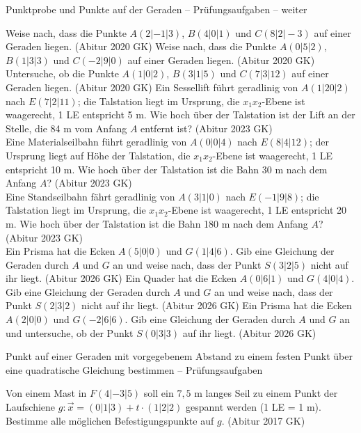 \begin{aufgabe}{Punktprobe und Punkte auf der Geraden – Prüfungsaufgaben – weiter}
\begin{teile}
\teil Weise nach, dass die Punkte $A(2 | -1 | 3)$, $B(4 | 0 | 1)$ und $C(8 | 2 | -3)$ auf einer Geraden liegen. \hfill (Abitur 2020 GK)
\teil Weise nach, dass die Punkte $A(0 | 5 | 2)$, $B(1 | 3 | 3)$ und $C(-2 | 9 | 0)$ auf einer Geraden liegen. \hfill (Abitur 2020 GK)
\teil Untersuche, ob die Punkte $A(1 | 0 | 2)$, $B(3 | 1 | 5)$ und $C(7 | 3 | 12)$ auf einer Geraden liegen. \hfill (Abitur 2020 GK)
\teil Ein Sessellift führt geradlinig von $A(1 | 20 | 2)$ nach $E(7 | 2 | 11)$; die Talstation liegt im Ursprung, die $x_1x_2$-Ebene ist waagerecht, 1 LE entspricht 5 m. Wie hoch über der Talstation ist der Lift an der Stelle, die 84 m vom Anfang $A$ entfernt ist? \hfill (Abitur 2023 GK) \\ \leerfeld[m]
\teil Eine Materialseilbahn führt geradlinig von $A(0 | 0 | 4)$ nach $E(8 | 4 | 12)$; der Ursprung liegt auf Höhe der Talstation, die $x_1x_2$-Ebene ist waagerecht, 1 LE entspricht 10 m. Wie hoch über der Talstation ist die Bahn 30 m nach dem Anfang $A$? \hfill (Abitur 2023 GK) \\ \leerfeld[m]
\teil Eine Standseilbahn fährt geradlinig von $A(3 | 1 | 0)$ nach $E(-1 | 9 | 8)$; die Talstation liegt im Ursprung, die $x_1x_2$-Ebene ist waagerecht, 1 LE entspricht 20 m. Wie hoch über der Talstation ist die Bahn 180 m nach dem Anfang $A$? \hfill (Abitur 2023 GK) \\ \leerfeld[m]
\teil Ein Prisma hat die Ecken $A(5 | 0 | 0)$ und $G(1 | 4 | 6)$. Gib eine Gleichung der Geraden durch $A$ und $G$ an und weise nach, dass der Punkt $S(3 | 2 | 5)$ nicht auf ihr liegt. \hfill (Abitur 2026 GK)
\teil Ein Quader hat die Ecken $A(0 | 6 | 1)$ und $G(4 | 0 | 4)$. Gib eine Gleichung der Geraden durch $A$ und $G$ an und weise nach, dass der Punkt $S(2 | 3 | 2)$ nicht auf ihr liegt. \hfill (Abitur 2026 GK)
\teil Ein Prisma hat die Ecken $A(2 | 0 | 0)$ und $G(-2 | 6 | 6)$. Gib eine Gleichung der Geraden durch $A$ und $G$ an und untersuche, ob der Punkt $S(0 | 3 | 3)$ auf ihr liegt. \hfill (Abitur 2026 GK)
\end{teile}
\end{aufgabe}

\begin{aufgabe}{Punkt auf einer Geraden mit vorgegebenem Abstand zu einem festen Punkt über eine quadratische Gleichung bestimmen – Prüfungsaufgaben}
\begin{teile}
\teil Von einem Mast in $F(4 | -3 | 5)$ soll ein $7{,}5$ m langes Seil zu einem Punkt der Laufschiene $g\colon \vec x = (0 | 1 | 3) + t \cdot (1 | 2 | 2)$ gespannt werden (1 LE = 1 m). Bestimme alle möglichen Befestigungspunkte auf $g$. \hfill (Abitur 2017 GK)
\end{teile}
\end{aufgabe}

